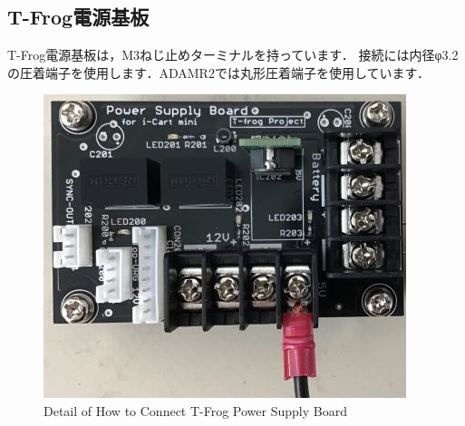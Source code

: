 \documentclass[{../../master}]{subfiles}
\begin{document}
  \subsection{T-Frog電源基板}
  T-Frog電源基板は，M3ねじ止めターミナルを持っています．
  接続には内径φ3.2の圧着端子を使用します．ADAMR2では丸形圧着端子を使用しています．

  \begin{figure}[ht]
    \centering
    \includegraphics[width=65truemm, clip]{images/t-frog.jpg}
    \caption{Detail of How to Connect T-Frog Power Supply Board}
    \label{fig:t-frog}
  \end{figure}
\end{document}
